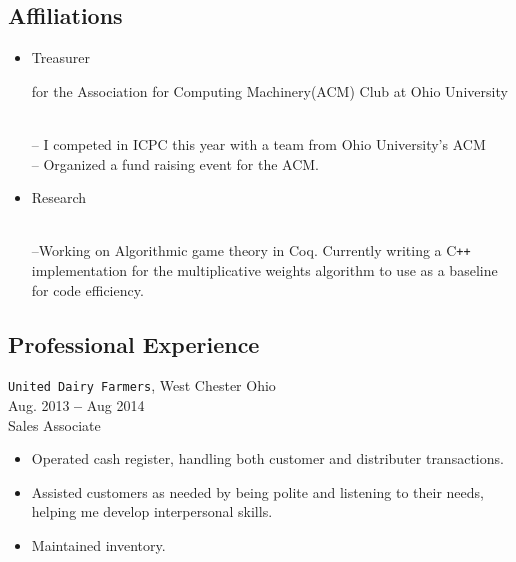 \documentclass[11pt]{article} %
\begin{document}
\subsection*{Affiliations}
\begin{itemize}
\item{\begin{bf}Treasurer\end{bf} for the Association for Computing Machinery(ACM) Club at Ohio University}\\
-- I competed in ICPC this year with a team from Ohio University's ACM \\
-- Organized a fund raising event for the ACM.
\item{\begin{bf}Research\end{bf} }\\--Working on Algorithmic game theory in Coq.  Currently writing a C\texttt{++} implementation for the multiplicative weights algorithm to use as a baseline for code efficiency.
\end{itemize}


\subsection*{Professional Experience}
\texttt{United Dairy Farmers}, West Chester Ohio\\
Aug. 2013 \textbf{--} Aug 2014\\
Sales Associate
\begin{itemize}
\item{Operated cash register, handling both customer and distributer transactions.}
\item{ Assisted customers as needed by being polite and listening to their needs, helping me develop interpersonal skills.}
\item{ Maintained inventory.}
\end{itemize}

           
\end{document}

